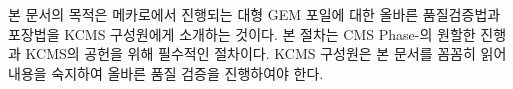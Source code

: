본 문서의 목적은 메카로에서 진행되는 대형 GEM 포일에 대한 올바른 품질검증법과 포장법을 KCMS 구성원에게 소개하는 것이다. 본 절차는 CMS Phase-의 원할한 진행과 KCMS의 공헌을 위해 필수적인 절차이다. KCMS 구성원은 본 문서를 꼼꼼히 읽어 내용을 숙지하여 올바른 품질 검증을 진행하여야 한다.
